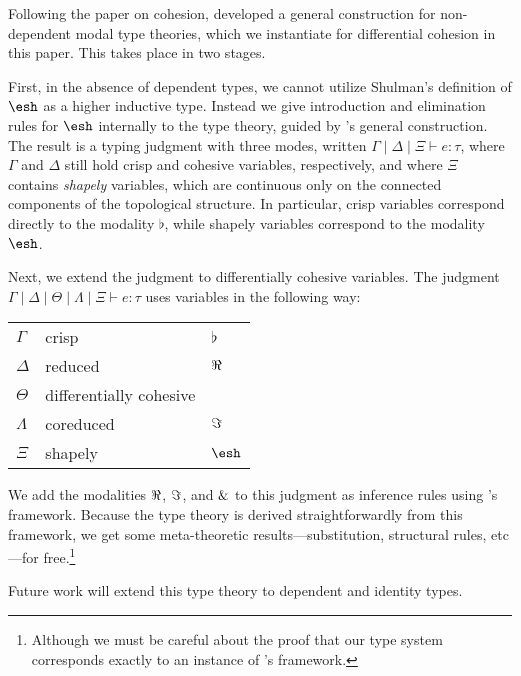 \documentclass{article}
\begin{document}
Following the \citeyear{Licata2016} paper on cohesion, \citet{Licata2017}
developed a general construction for non-dependent modal type theories, which we
instantiate for differential cohesion in this paper. This takes place in two
stages. 

First, in the absence of dependent types, we cannot utilize Shulman's definition
of $\shape$ as a higher inductive type. Instead we give introduction and
elimination rules for $\shape$ internally to the type theory, guided by
\citeauthor{Licata2017}'s general construction. The result is a typing judgment
with three modes, written $\Gamma \mid \Delta \mid \Xi \vdash e : \tau$, where
$\Gamma$ and $\Delta$ still hold crisp and cohesive variables, respectively, and
where $\Xi$ contains \emph{shapely} variables, which are continuous only on the
connected components of the topological structure. In particular, crisp
variables correspond directly to the modality $\flat$, while shapely variables
correspond to the modality $\shape$.

Next, we extend the judgment to differentially cohesive variables. The judgment
$\Gamma \mid \Delta \mid \Theta \mid \Lambda \mid \Xi \vdash e : \tau$ uses
variables in the following way:
\begin{center} \begin{tabular}{lll}
    $\Gamma$ & crisp  &  $\flat$ \\
    $\Delta$ & reduced & $\Re$ \\
    $\Theta$ & differentially cohesive & \\
    $\Lambda$ & coreduced & $\Im$ \\
    $\Xi$ & shapely & $\shape$
\end{tabular} \end{center}
%
We add the modalities $\Re$, $\Im$, and $\&$ to this judgment as inference
rules using \citeauthor{Licata2017}'s framework. Because the type theory is
derived straightforwardly from this framework, we get some meta-theoretic
results---substitution, structural rules, etc---for free.\footnote{Although we
  must be careful about the proof that our type system corresponds exactly to an
  instance of \citeauthor{Licata2017}'s framework.} 


Future work will extend this type theory to dependent and identity types.





\end{document}
